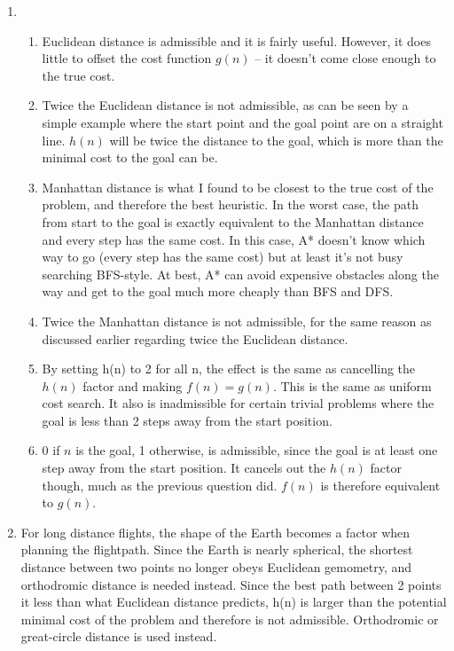 \documentclass[11pt]{article}
\begin{document}
\begin{enumerate}
\item \begin{enumerate}
	  \item Euclidean distance is admissible and it is fairly useful. However, it does little to offset the cost function $g(n)$ -- it doesn't come close enough to the true cost.
	  \item Twice the Euclidean distance is not admissible, as can be seen by a simple example where the start point and the goal point are on a straight line. $h(n)$ will be twice the distance to the goal, which is more than the minimal cost to the goal can be.

      \item Manhattan distance is what I found to be closest to the true cost of the problem, and therefore the best heuristic. In the worst case, the path from start to the goal is exactly equivalent to the Manhattan distance and every step has the same cost. In this case, A* doesn't know which way to go (every step has the same cost) but at least it's not busy searching BFS-style. At best, A* can avoid expensive obstacles along the way and get to the goal much more cheaply than BFS and DFS.

	  \item Twice the Manhattan distance is not admissible, for the same reason as discussed earlier regarding twice the Euclidean distance.

	  \item By setting h(n) to 2 for all n, the effect is the same as cancelling the $h(n)$ factor and making $f(n) = g(n)$. This is the same as uniform cost search. It also is inadmissible for certain trivial problems where the goal is less than 2 steps away from the start position.

	  \item 0 if $n$ is the goal, 1 otherwise, is admissible, since the goal is at least one step away from the start position. It cancels out the $h(n)$ factor though, much as the previous question did. $f(n)$ is therefore equivalent to $g(n)$.
	  \end{enumerate}

\item For long distance flights, the shape of the Earth becomes a factor when planning the flightpath. Since the Earth is nearly spherical, the shortest distance between two points no longer obeys Euclidean gemometry, and orthodromic distance is needed instead. Since the best path between 2 points it less than what Euclidean distance predicts, h(n) is larger than the potential minimal cost of the problem and therefore is not admissible. Orthodromic or great-circle distance is used instead.

\end{enumerate}
\end{document}
